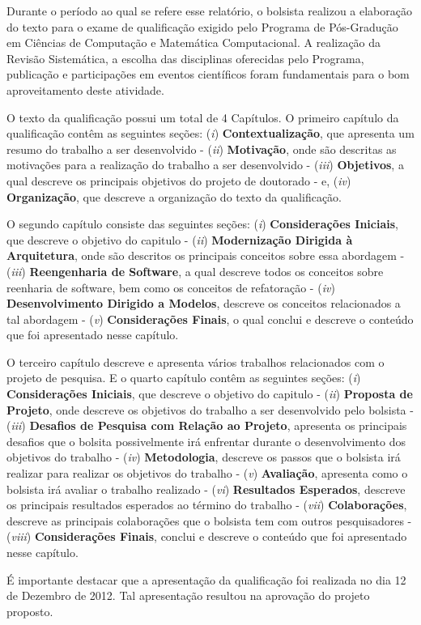Durante o período ao qual se refere esse relatório, o bolsista realizou a elaboração do texto para o exame de qualificação exigido pelo Programa de Pós-Gradução em Ciências de Computação e Matemática Computacional. A realização da Revisão Sistemática, a escolha das disciplinas oferecidas pelo Programa, publicação e participações em eventos científicos foram fundamentais para o bom aproveitamento deste atividade.

O texto da qualificação possui um total de 4 Capítulos. O primeiro capítulo da qualificação contêm as seguintes seções: (\textit{i}) \textbf{Contextualização}, que apresenta um resumo do trabalho a ser desenvolvido - (\textit{ii}) \textbf{Motivação}, onde são descritas as motivações para a realização do trabalho a ser desenvolvido - (\textit{iii}) \textbf{Objetivos}, a qual descreve os principais objetivos do projeto de doutorado - e, (\textit{iv}) \textbf{Organização}, que descreve a organização do texto da qualificação. 

O segundo capítulo consiste das seguintes seções: (\textit{i}) \textbf{Considerações Iniciais}, que descreve o objetivo do capitulo - (\textit{ii}) \textbf{Modernização Dirigida à Arquitetura}, onde são descritos os principais conceitos sobre essa abordagem - (\textit{iii}) \textbf{Reengenharia de Software}, a qual descreve todos os conceitos sobre reenharia de software, bem como os conceitos de refatoração - (\textit{iv}) \textbf{Desenvolvimento Dirigido a Modelos}, descreve os conceitos relacionados a tal abordagem - (\textit{v}) \textbf{Considerações Finais}, o qual conclui e descreve o conteúdo que foi apresentado nesse capítulo. 

O terceiro capítulo descreve e apresenta vários trabalhos relacionados com o projeto de pesquisa. E o quarto capítulo contêm as seguintes seções: (\textit{i}) \textbf{Considerações Iniciais}, que descreve o objetivo do capitulo - (\textit{ii}) \textbf{Proposta de Projeto}, onde descreve os objetivos do trabalho a ser desenvolvido pelo bolsista - (\textit{iii}) \textbf{Desafios de Pesquisa com Relação ao Projeto}, apresenta os principais desafios que o bolsita possivelmente irá enfrentar durante o desenvolvimento dos objetivos do trabalho - (\textit{iv}) \textbf{Metodologia}, descreve os passos que o bolsista irá realizar para realizar os objetivos do trabalho - (\textit{v}) \textbf{Avaliação}, apresenta como o bolsista irá avaliar o trabalho realizado - (\textit{vi}) \textbf{Resultados Esperados}, descreve os principais resultados esperados ao término do trabalho - (\textit{vii}) \textbf{Colaborações}, descreve as principais colaborações que o bolsista tem com outros pesquisadores - (\textit{viii}) \textbf{Considerações Finais}, conclui e descreve o conteúdo que foi apresentado nesse capítulo.

É importante destacar que a apresentação da qualificação foi realizada no dia 12 de Dezembro de 2012. Tal apresentação resultou na aprovação do projeto proposto.